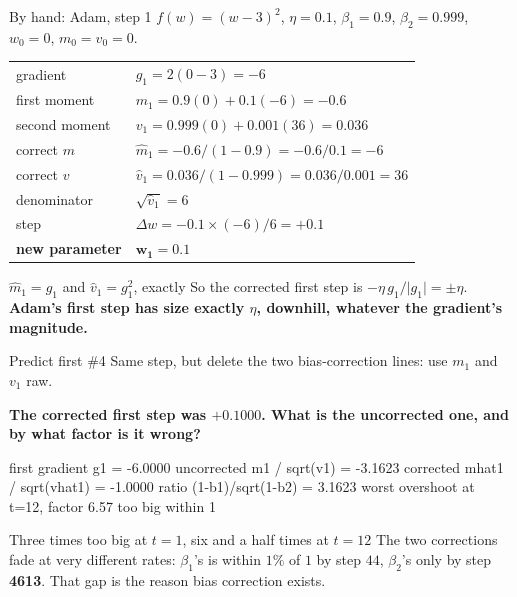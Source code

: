 \documentclass[aspectratio=169]{beamer}
\begin{document}
\begin{frame}[shrink=5]{By hand: Adam, step 1}
  $f(w)=(w-3)^2$, $\eta = 0.1$, $\beta_1 = 0.9$, $\beta_2 = 0.999$, $w_0 = 0$,
  $m_0 = v_0 = 0$.
  \begin{center}\small
  \begin{tabular}{@{}ll@{}}
    \toprule
    gradient      & $g_1 = 2(0 - 3) = -6$\\[3pt]
    first moment  & $m_1 = 0.9(0) + 0.1(-6) = -0.6$\\[3pt]
    second moment & $v_1 = 0.999(0) + 0.001(36) = 0.036$\\[3pt]
    correct $m$   & $\hat m_1 = -0.6/(1-0.9) = -0.6/0.1 = -6$\\[3pt]
    correct $v$   & $\hat v_1 = 0.036/(1-0.999) = 0.036/0.001 = 36$\\[3pt]
    denominator   & $\sqrt{\hat v_1} = 6$\\[3pt]
    step          & $\Delta w = -0.1 \times (-6)/6 = +0.1$\\[3pt]
    \textbf{new parameter} & $\mathbf{w_1 = 0.1}$\\
    \bottomrule
  \end{tabular}
  \end{center}
  \vspace{0.2em}
  \begin{exampleblock}{$\hat m_1 = g_1$ and $\hat v_1 = g_1^2$, exactly}
    \small So the corrected first step is $-\eta\, g_1/\lvert g_1\rvert =
    \pm\eta$. \textbf{Adam's first step has size exactly $\eta$, downhill,
    whatever the gradient's magnitude.}
  \end{exampleblock}
\end{frame}

\begin{frame}[fragile]{Predict first \#4}
Same step, but delete the two bias-correction lines: use $m_1$ and $v_1$ raw.
\begin{center}
  \textbf{The corrected first step was $+0.1000$. What is the uncorrected one,
  and by what factor is it wrong?}
\end{center}
\begin{outblk}
first gradient                g1        = -6.0000
uncorrected  m1 / sqrt(v1)              = -3.1623
corrected    mhat1 / sqrt(vhat1)        = -1.0000
ratio  (1-b1)/sqrt(1-b2)                = 3.1623
worst overshoot at t=12, factor 6.57 too big
within 1%
\end{outblk}
\begin{alertblock}{Three times too big at $t=1$, six and a half times at $t=12$}
  \footnotesize The two corrections fade at very different rates: $\beta_1$'s is
  within $1\%$ of $1$ by step $44$, $\beta_2$'s only by step \textbf{4613}. That
  gap is the reason bias correction exists.
\end{alertblock}
\end{frame}
\end{document}
